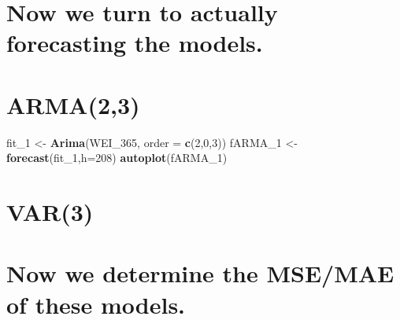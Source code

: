 \documentclass[]{article}
\newenvironment{Shaded}{\begin{snugshade}}{\end{snugshade}}
\newcommand{\KeywordTok}[1]{\textcolor[rgb]{0.13,0.29,0.53}{\textbf{#1}}}
\newcommand{\DataTypeTok}[1]{\textcolor[rgb]{0.13,0.29,0.53}{#1}}
\newcommand{\DecValTok}[1]{\textcolor[rgb]{0.00,0.00,0.81}{#1}}
\newcommand{\StringTok}[1]{\textcolor[rgb]{0.31,0.60,0.02}{#1}}
\newcommand{\OperatorTok}[1]{\textcolor[rgb]{0.81,0.36,0.00}{\textbf{#1}}}
\newcommand{\NormalTok}[1]{#1}
\begin{document}
\section{Now we turn to actually forecasting the
models.}\label{now-we-turn-to-actually-forecasting-the-models.}

\section{ARMA(2,3)}\label{arma23}

\begin{Shaded}
\begin{Highlighting}[]
\NormalTok{fit_}\DecValTok{1}\NormalTok{ <-}\StringTok{ }\KeywordTok{Arima}\NormalTok{(WEI_}\DecValTok{365}\NormalTok{, }\DataTypeTok{order =} \KeywordTok{c}\NormalTok{(}\DecValTok{2}\NormalTok{,}\DecValTok{0}\NormalTok{,}\DecValTok{3}\NormalTok{))}
\NormalTok{fARMA_}\DecValTok{1}\NormalTok{ <-}\StringTok{ }\KeywordTok{forecast}\NormalTok{(fit_}\DecValTok{1}\NormalTok{,}\DataTypeTok{h=}\DecValTok{208}\NormalTok{)}
\KeywordTok{autoplot}\NormalTok{(fARMA_}\DecValTok{1}\NormalTok{) }
\end{Highlighting}
\end{Shaded}

\section{VAR(3)}\label{var3}

\begin{Shaded}
\end{Shaded}

\section{Now we determine the MSE/MAE of these
models.}\label{now-we-determine-the-msemae-of-these-models.}
\end{document}
